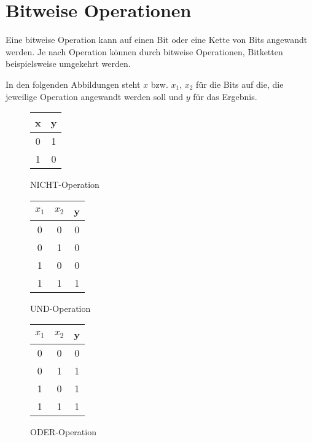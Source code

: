 \chapter{Bitweise Operationen}
\begin{flushleft}   
Eine bitweise Operation kann auf einen Bit oder eine Kette von Bits angewandt werden.
Je nach Operation können durch bitweise Operationen, Bitketten beispielsweise umgekehrt werden.

In den folgenden Abbildungen steht $x$ bzw. $x_1$, $x_2$ für die Bits auf die, die jeweilige Operation angewandt werden soll und $y$ für das Ergebnis.
\end{flushleft}

\begin{figure}[ht]
    \centering
    \begin{tabular}{|c|c|}
        \hline
        x & y \\
        \hline
        0 & 1 \\
        \hline
        1 & 0 \\
        \hline
    \end{tabular}
    \caption{NICHT-Operation}
\end{figure}

\begin{figure}[ht]
    \centering
    \begin{tabular}{|c|c|c|}
        \hline
        $x_1$ & $x_2$ & y \\
        \hline
        0 & 0 & 0 \\
        \hline
        0 & 1 & 0 \\
        \hline
        1 & 0 & 0 \\
        \hline
        1 & 1 & 1 \\
        \hline
    \end{tabular}
    \caption{UND-Operation}
\end{figure}

\begin{figure}[ht]
    \centering
    \begin{tabular}{|c|c|c|}
        \hline
        $x_1$ & $x_2$ & y \\
        \hline
        0 & 0 & 0 \\
        \hline
        0 & 1 & 1 \\
        \hline
        1 & 0 & 1 \\
        \hline
        1 & 1 & 1 \\
        \hline
    \end{tabular}
    \caption{ODER-Operation}
    \label{fig:or}
\end{figure}

